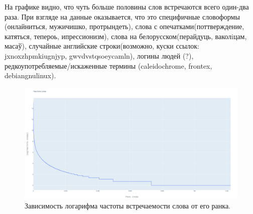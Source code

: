 На графике видно, что чуть больше половины слов встречаются всего один-два раза. При взгляде на данные оказывается, что это специфичные словоформы (онлайниться, мужичишко, протрындеть), слова с опечатками(поттверждение, катяться, тепероь, ипрессионизм), слова на белорусском(перайдуць, ваколiцам, масаў), случайные английские строки(возможно, куски ссылок: jxnoxzhpmkiugnjyp, gwvdvstqsoeycamln), логины людей (?), редкоупотребляемые/искаженные термины (caleidochrome, frontex, debiangnulinux).


\begin{figure}
	\includegraphics[width=.5\textwidth]{rank_to_frequency.png}
	\caption{Зависимость логарифма частоты встречаемости слова от его ранка.}
	\label{fig_rank_to_frequency}
\end{figure}
